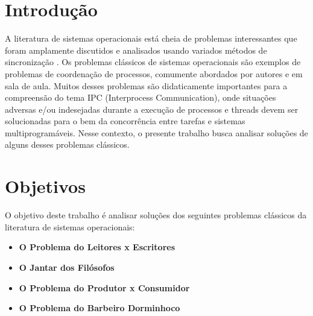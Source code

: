 \documentclass[
	12pt,				%
	openright,			%
	oneside,			%
	a4paper,			%
	chapter=TITLE,		%
	english,			%
	french,				%
	spanish,			%
	brazil				%
	]{abntex2}
\theoremstyle{definition}
\begin{document}
\frenchspacing 

\imprimircapa


\imprimirfolhaderosto

\newpage

\setlength{\absparsep}{18pt} %

\tableofcontents*
\cleardoublepage
\textual


\chapter{Introdução}

A literatura de sistemas operacionais está cheia de problemas interessantes que foram amplamente discutidos e analisados usando variados métodos de sincronização \cite{tanenbaum2010sistemas}. Os problemas clássicos de sistemas operacionais são exemplos de problemas de coordenação de processos, comumente abordados por autores e em sala de aula. Muitos desses problemas são didaticamente importantes para a compreensão do tema IPC (Interprocess Communication), onde situações adversas e/ou indesejadas durante a execução de processos e threads devem ser solucionadas para o bem da concorrência entre tarefas e sistemas multiprogramáveis. Nesse contexto, o presente trabalho busca analisar soluções de alguns desses problemas clássicos.

\chapter{Objetivos}

O objetivo deste trabalho é analisar soluções dos seguintes problemas clássicos da literatura de sistemas operacionais:

\begin{itemize}
	\item \textbf{O Problema do Leitores x Escritores}
	\item \textbf{O Jantar dos Filósofos}
	\item \textbf{O Problema do Produtor x Consumidor}
	\item \textbf{O Problema do Barbeiro Dorminhoco}
  \end{itemize}
  
\end{document}
